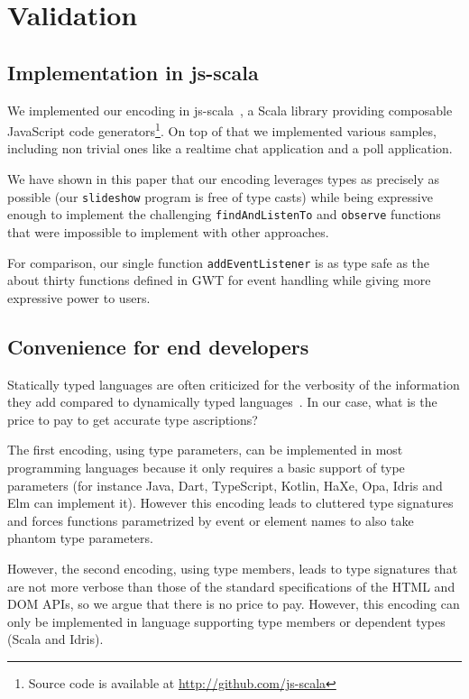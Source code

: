 \documentclass{llncs}
\newcommand{\jscode}[1]{\lstinline[language=JavaScript]|#1|}
\newcommand{\scalacode}[1]{\lstinline[language=Scala]|#1|}
\begin{document}
\section{Validation}
\label{sec-validation}

\subsection{Implementation in js-scala}

We implemented our encoding in js-scala~\cite{Kossakowski12_JsDESL}, a Scala library providing composable JavaScript code generators\footnote{Source code is available at \href{http://github.com/js-scala}{http://github.com/js-scala}}. On top of that we implemented various samples, including non trivial ones like a realtime chat application and a poll application.

We have shown in this paper that our encoding leverages types as precisely as possible (our \scalacode{slideshow} program is free of type casts) while being expressive enough to implement the challenging \jscode{findAndListenTo} and \jscode{observe} functions that were impossible to implement with other approaches.

For comparison, our single function \scalacode{addEventListener} is as type safe as the about thirty functions defined in GWT for event handling while giving more expressive power to users.

\subsection{Convenience for end developers}

Statically typed languages are often criticized for the verbosity of the information they add compared to dynamically typed languages~\cite{meijer2004static}. In our case, what is the price to pay to get accurate type ascriptions?

The first encoding, using type parameters, can be implemented in most programming languages because it only requires a basic support of type parameters (for instance Java, Dart, TypeScript, Kotlin, HaXe, Opa, Idris and Elm can implement it). However this encoding leads to cluttered type signatures and forces functions parametrized by event or element names to also take phantom type parameters.

However, the second encoding, using type members, leads to type signatures that are not more verbose than those of the standard specifications of the HTML and DOM APIs, so we argue that there is no price to pay. However, this encoding can only be implemented in language supporting type members or dependent types (Scala and Idris).
\end{document}
